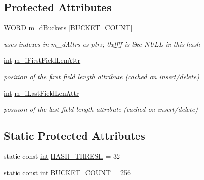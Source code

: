 \subsection*{Protected Attributes}
\begin{DoxyCompactItemize}
\item 
\hyperlink{sphinxstd_8h_a197942eefa7db30960ae396d68339b97}{W\-O\-R\-D} \hyperlink{classCSphSchema_ae45e9f7aa6c6689c55207315b723cb4a}{m\-\_\-d\-Buckets} \mbox{[}\hyperlink{classCSphSchema_aeb38dfa5e7b6aa1b575487d67b73cf9e}{B\-U\-C\-K\-E\-T\-\_\-\-C\-O\-U\-N\-T}\mbox{]}
\begin{DoxyCompactList}\small\item\em uses indexes in m\-\_\-d\-Attrs as ptrs; 0xffff is like N\-U\-L\-L in this hash \end{DoxyCompactList}\item 
\hyperlink{sphinxexpr_8cpp_a4a26e8f9cb8b736e0c4cbf4d16de985e}{int} \hyperlink{classCSphSchema_a51e341999cdda7154b60b536ff09bd15}{m\-\_\-i\-First\-Field\-Len\-Attr}
\begin{DoxyCompactList}\small\item\em position of the first field length attribute (cached on insert/delete) \end{DoxyCompactList}\item 
\hyperlink{sphinxexpr_8cpp_a4a26e8f9cb8b736e0c4cbf4d16de985e}{int} \hyperlink{classCSphSchema_aae2d47f85e1897dc10517f9af57ad7b7}{m\-\_\-i\-Last\-Field\-Len\-Attr}
\begin{DoxyCompactList}\small\item\em position of the last field length attribute (cached on insert/delete) \end{DoxyCompactList}\end{DoxyCompactItemize}
\subsection*{Static Protected Attributes}
\begin{DoxyCompactItemize}
\item 
static const \hyperlink{sphinxexpr_8cpp_a4a26e8f9cb8b736e0c4cbf4d16de985e}{int} \hyperlink{classCSphSchema_a06381a7bc923a8ebc3c77cabb9330078}{H\-A\-S\-H\-\_\-\-T\-H\-R\-E\-S\-H} = 32
\item 
static const \hyperlink{sphinxexpr_8cpp_a4a26e8f9cb8b736e0c4cbf4d16de985e}{int} \hyperlink{classCSphSchema_aeb38dfa5e7b6aa1b575487d67b73cf9e}{B\-U\-C\-K\-E\-T\-\_\-\-C\-O\-U\-N\-T} = 256
\end{DoxyCompactItemize}
